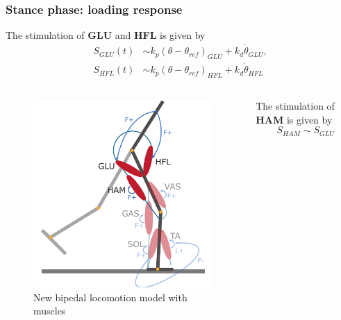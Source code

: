 \documentclass[10pt]{beamer}
\begin{document}
	
	\begin{frame}
		\frametitle{Stance phase: loading response}
		
		\begin{block}{}
			The stimulation of \textbf{GLU} and \textbf{HFL}  is given by
			\begin{align*}
				S_{GLU}(t) &\sim k_p (\theta-\theta_{ref})_{GLU} + k_d \dot{\theta}_{GLU}, \\
				S_{HFL}(t) &\sim k_p (\theta-\theta_{ref})_{HFL} + k_d \dot{\theta}_{HFL}
			\end{align*}
		\end{block}
		
		\begin{columns}
			\begin{column}{.5\textwidth}
				\begin{figure}
					\centering
					\includegraphics[height=.45\textheight]{images/new_model/stance/muscle_vas_sol_gas_ta_ham_glu_hfl_floor.pdf}
					\caption{New bipedal locomotion model with muscles}	
				\end{figure}
			\end{column}
			\begin{column}{.5\textwidth}
				\begin{block}{}
					The stimulation of \textbf{HAM} is given by	
					\begin{equation*}
						S_{HAM} \sim S_{GLU}

\end{equation*}
\end{block}
\end{column}
\end{columns}
\end{frame}
\end{document}
